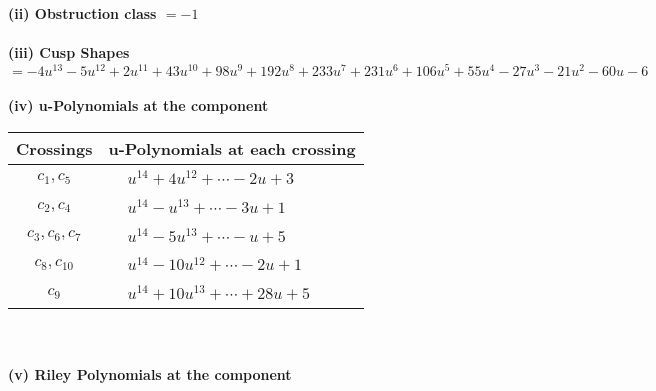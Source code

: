 \documentclass[1p]{elsarticle_modified}
\theoremstyle{definition}
\begin{document}
\flushleft \textbf{(ii) Obstruction class $= -1$}\\~\\
\flushleft \textbf{(iii) Cusp Shapes $= -4 u^{13}-5 u^{12}+2 u^{11}+43 u^{10}+98 u^9+192 u^8+233 u^7+231 u^6+106 u^5+55 u^4-27 u^3-21 u^2-60 u-6$}\\~\\
\newpage\renewcommand{\arraystretch}{1}
\flushleft \textbf{(iv) u-Polynomials at the component}\newline \\
\begin{tabular}{m{50pt}|m{274pt}}
Crossings & \hspace{64pt}u-Polynomials at each crossing \\
\hline $$\begin{aligned}c_{1},c_{5}\end{aligned}$$&$\begin{aligned}
&u^{14}+4 u^{12}+\cdots-2 u+3
\end{aligned}$\\
\hline $$\begin{aligned}c_{2},c_{4}\end{aligned}$$&$\begin{aligned}
&u^{14}- u^{13}+\cdots-3 u+1
\end{aligned}$\\
\hline $$\begin{aligned}c_{3},c_{6},c_{7}\end{aligned}$$&$\begin{aligned}
&u^{14}-5 u^{13}+\cdots- u+5
\end{aligned}$\\
\hline $$\begin{aligned}c_{8},c_{10}\end{aligned}$$&$\begin{aligned}
&u^{14}-10 u^{12}+\cdots-2 u+1
\end{aligned}$\\
\hline $$\begin{aligned}c_{9}\end{aligned}$$&$\begin{aligned}
&u^{14}+10 u^{13}+\cdots+28 u+5
\end{aligned}$\\
\hline
\end{tabular}\\~\\
\newpage\renewcommand{\arraystretch}{1}
\flushleft \textbf{(v) Riley Polynomials at the component}\newline \\
\end{document}
